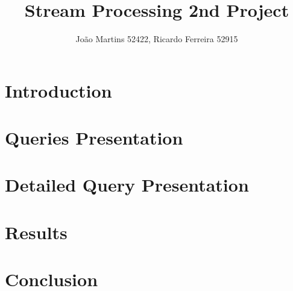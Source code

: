 \documentclass[runningheads]{llncs}
\begin{document}
\title{Stream Processing 2nd Project}
%
%
\author{João Martins 52422, Ricardo Ferreira 52915}

%
\maketitle              %
%
\vspace{-0.6cm}

\section{Introduction}


\section{Queries Presentation}


\section{Detailed Query Presentation}


\section{Results}


\section{Conclusion}





\end{document}
